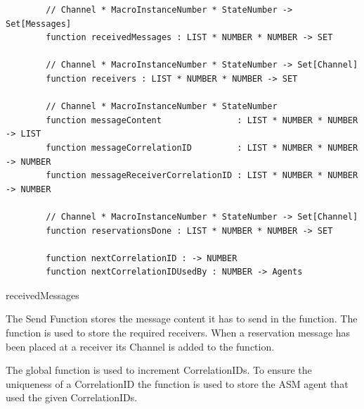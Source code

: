 \begin{listing}[H]
	\begin{verbatim}
		// Channel * MacroInstanceNumber * StateNumber -> Set[Messages]
		function receivedMessages : LIST * NUMBER * NUMBER -> SET
		
		// Channel * MacroInstanceNumber * StateNumber -> Set[Channel]
		function receivers : LIST * NUMBER * NUMBER -> SET
		
		// Channel * MacroInstanceNumber * StateNumber
		function messageContent               : LIST * NUMBER * NUMBER -> LIST
		function messageCorrelationID         : LIST * NUMBER * NUMBER -> NUMBER
		function messageReceiverCorrelationID : LIST * NUMBER * NUMBER -> NUMBER
		
		// Channel * MacroInstanceNumber * StateNumber -> Set[Channel]
		function reservationsDone : LIST * NUMBER * NUMBER -> SET
		
		function nextCorrelationID : -> NUMBER
		function nextCorrelationIDUsedBy : NUMBER -> Agents
	\end{verbatim}
	\caption{receivedMessages}
	\label{lst:shortasm:receivedMessages}
\end{listing}

The Send Function stores the message content it has to send in the
 function. The  function is
used to store the required receivers. When a reservation message has been
placed at a receiver its Channel is added to the 
function.

The global function  is used to increment
CorrelationIDs. To ensure the uniqueness of a CorrelationID the
 function is used to store the ASM agent
that used the given CorrelationIDs.

